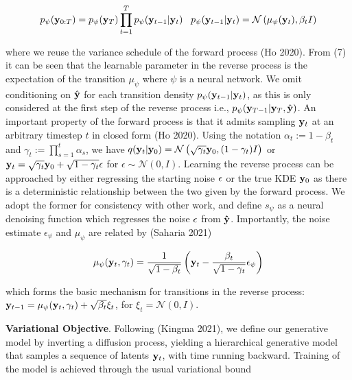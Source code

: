 \documentclass{article}
\begin{document}
\begin{equation}
p_{\psi}(\bold{y}_{0:T}) = p_{\psi}(\bold{y}_{T})\prod_{t=1}^{T} p_{\psi}(\bold{y}_{t-1}|\bold{y}_{t}) \;\;\; p_{\psi}(\bold{y}_{t-1}|\bold{y}_{t}) = \mathcal{N}\left(\mu_{\psi}(\bold{y}_{t}),\beta_{t}I\right)
\end{equation}

where we reuse the variance schedule of the forward process (Ho 2020). From (7) it can be seen that the learnable parameter in the reverse process is the expectation of the transition $\mu_{\psi}$ where $\psi$ is a neural network. We omit conditioning on $\hat{\bold{y}}$ for each transition density $p_{\psi}(\bold{y}_{t-1}|\bold{y}_{t})$, as this is only considered at the first step of the reverse process i.e., $p_{\psi}(\bold{y}_{T-1}|\bold{y}_{T},\hat{\bold{y}})$. An important property of the forward process is that it admits sampling $\bold{y}_t$ at an arbitrary timestep $t$ in closed form (Ho 2020). Using the notation $\alpha_t := 1 - \beta_t$ and $\gamma_t := \prod_{s=1}^{t} \alpha_s$, we have $q(\bold{y}_t|\bold{y}_0) = \mathcal{N} \left(\sqrt{\gamma_{t}} \bold{y}_{0}, (1 - \gamma_t)I \right)$ or $\bold{y}_{t} = \sqrt{\gamma_{t}}\bold{y}_{0} + \sqrt{1-\gamma_{t}}\bold{\epsilon}$ for $\epsilon \sim \mathcal{N}(0,I)$. Learning the reverse process can be approached by either regressing the starting noise $\bold{\epsilon}$ or the true KDE $\bold{y}_{0}$ as there is a deterministic relationship between the two given by the forward process. We adopt the former for consistency with other work, and define $s_{\psi}$ as a neural denoising function which regresses the noise $\bold{\epsilon}$ from $\bold{\hat{y}}$. Importantly, the noise estimate $\epsilon_{\psi}$ and $\mu_{\psi}$ are related by (Saharia 2021)

\begin{equation}
\mu_{\psi}(\bold{y}_{t},\gamma_{t}) = \frac{1}{\sqrt{1-\beta_{t}}}\left(\bold{y}_{t} - \frac{\beta_{t}}{\sqrt{1-\gamma_{t}}}\epsilon_{\psi}\right)
\end{equation}

which forms the basic mechanism for transitions in the reverse process: $\bold{y}_{t-1} = \mu_{\psi}(\bold{y}_{t},\gamma_{t}) + \sqrt{\beta_{t}}\xi_{t}$, for $\xi_{t} = \mathcal{N}(0,I)$.

\textbf{Variational Objective}. Following (Kingma 2021), we define our generative model by inverting a diffusion process, yielding a hierarchical generative model that samples a sequence of latents $\bold{y}_{t}$, with time running backward. Training of the model is achieved through the usual variational bound
\end{document}

